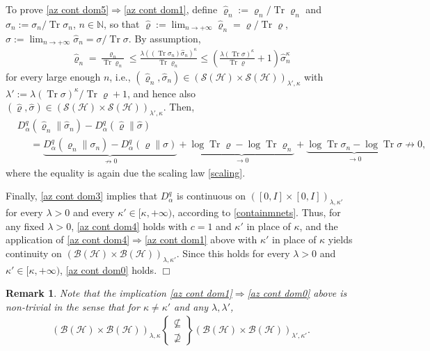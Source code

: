 \documentclass[unsortedaddress,superscriptaddress,pra,notitlepage]{revtex4}
\newtheorem{rem}[definition]{Remark}
\newenvironment{proof}[1][Proof]{\begin{trivlist}
\item[\hskip \labelsep {\bfseries #1}]}{\hfill$\Box$\end{trivlist}}
\def\B{{\mathcal B}}
\def\S{{\mathcal S}}
\def\bN{\mathbb{N}}
\def\rho{\varrho}
\def\hil{{\mathcal H}}
\def\imp{\Longrightarrow}
\def\bz{\left(}
\def\jz{\right)}
\def\pwr{\kappa}
\newcommand{\ds}{\mbox{ }\mbox{ }}
\DeclareMathOperator{\Tr}{Tr}
\begin{document}
\begin{proof}
To prove \ref{az cont dom5}$\imp$\ref{az cont dom1},
define 
$\hat\rho_n:=\rho_n/\Tr\rho_n$ and 
$\hat\sigma_n:=\sigma_n/\Tr\sigma_n$, $n\in\bN$, so that 
$\hat\rho:=\lim_{n\to+\infty}\hat\rho_n=\rho/\Tr\rho$, 
$\hat\sigma:=\lim_{n\to+\infty}\hat\sigma_n=\sigma/\Tr\sigma$.
By assumption,
\begin{align*}
\hat\rho_n=\frac{\rho_n}{\Tr\rho_n}
\le
\frac{\lambda((\Tr\sigma_n)\hat\sigma_n)^{\pwr}}{\Tr\rho_n}
\le
\bz\frac{\lambda(\Tr\sigma)^{\pwr}}{\Tr\rho}+1\jz\hat\sigma_n^{\pwr}
\end{align*}
for every large enough $n$, i.e., 
$(\hat\rho_n,\hat\sigma_n)\in(\S(\hil)\times\S(\hil))_{\lambda',\pwr}$
with
$\lambda' :=\lambda(\Tr\sigma)^{\pwr}/\Tr\rho+1$,
and hence also $(\hat\rho,\hat\sigma)\in
(\S(\hil)\times\S(\hil))_{\lambda',\pwr}$. Then,
\begin{align*}
&D_{\alpha}^q(\hat\rho_n\|\hat\sigma_n)-
D_{\alpha}^q(\hat\rho\|\hat\sigma)\\
&\ds=
\underbrace{D_{\alpha}^q(\rho_n\|\sigma_n)-D_{\alpha}^q(\rho\|\sigma)}_{
\not\to 0}
+\underbrace{\log\Tr\rho-\log\Tr\rho_n}_{\to 0}
+\underbrace{\log\Tr\sigma_n-\log\Tr\sigma}_{\to 0}
\not\to 0,
\end{align*}
where the equality is again due the scaling law \eqref{scaling}.

Finally, \ref{az cont dom3} implies that $D_{\alpha}^q$ is continuous on 
$([0,I]\times[0,I])_{\lambda,\pwr'}$ for every $\lambda>0$
and every $\pwr'\in[\pwr,+\infty)$, according to \eqref{containmnets}.
Thus, for any fixed $\lambda>0$, \ref{az cont dom4} holds with $c=1$ and $\pwr'$ in place of $\pwr$, and the application of \ref{az cont dom4}$\imp$\ref{az cont dom1} above with $\pwr'$ in place of $\pwr$ yields continuity on $(\B(\hil)\times\B(\hil))_{\lambda,\pwr'}$. Since this holds for every $\lambda>0$ and $\pwr'\in[\pwr,+\infty)$, \ref{az cont dom0} holds.
\end{proof}

\begin{rem}
Note that the implication  \ref{az cont dom1}$\imp$\ref{az cont dom0}
above is non-trivial in the sense that 
for $\pwr\ne\pwr'$ and any $\lambda,\lambda'$, 
\begin{align*}
(\B(\hil)\times\B(\hil))_{\lambda,\pwr}
\left\{\begin{array}{c}\not\subseteq\\ \not\supseteq\end{array}\right\}
(\B(\hil)\times\B(\hil))_{\lambda',\pwr'}.
%
\end{align*}
\end{rem}
\end{document}
